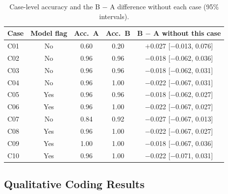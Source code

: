 \begin{table}[H]
\centering
\caption{Case-level accuracy and the B $-$ A difference without each case (95\% intervals).}
\label{tab:cases}
\footnotesize
\begin{tabular}{@{}lcccc@{}}
\toprule
\textbf{Case} & \textbf{Model flag} & \textbf{Acc.\ A} & \textbf{Acc.\ B} & \textbf{B $-$ A without this case} \\
\midrule
C01 & No  & 0.60 & 0.20 & $+$0.027 [$-$0.013, 0.076] \\
C02 & No  & 0.96 & 0.96 & $-$0.018 [$-$0.062, 0.036] \\
C03 & No  & 0.96 & 0.96 & $-$0.018 [$-$0.062, 0.031] \\
C04 & No  & 0.96 & 1.00 & $-$0.022 [$-$0.067, 0.031] \\
C05 & Yes & 0.96 & 0.96 & $-$0.018 [$-$0.062, 0.027] \\
C06 & Yes & 0.96 & 1.00 & $-$0.022 [$-$0.067, 0.027] \\
C07 & No  & 0.84 & 0.92 & $-$0.027 [$-$0.067, 0.013] \\
C08 & Yes & 0.96 & 1.00 & $-$0.022 [$-$0.067, 0.027] \\
C09 & Yes & 1.00 & 1.00 & $-$0.018 [$-$0.067, 0.036] \\
C10 & Yes & 0.96 & 1.00 & $-$0.022 [$-$0.071, 0.031] \\
\bottomrule
\end{tabular}
\end{table}

\subsection{Qualitative Coding Results}

